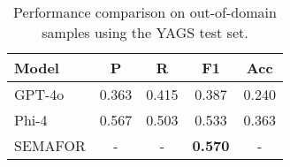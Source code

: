 \begin{table}
    \centering
    \begin{tabularx}{\linewidth}{Xcccc}
        \hline
        \textbf{Model} & \textbf{P} & \textbf{R} & \textbf{F1} & \textbf{Acc} \\ 
        \hline
        GPT-4o           & 0.363 & 0.415 & 0.387 & 0.240 \\
        Phi-4            & 0.567 & 0.503 & 0.533 & 0.363 \\ 
        \hline
        SEMAFOR          & -     & -     & \textbf{0.570} & -     \\
        \hline
    \end{tabularx}
    \caption{Performance comparison on out-of-domain samples using the YAGS test set.}
    \label{tab:yags}
\end{table}
